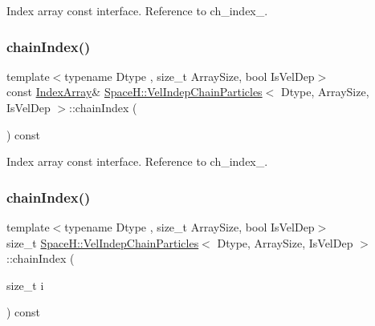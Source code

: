 Index array const interface. Reference to ch\+\_\+index\+\_\+. 

\mbox{\label{class_space_h_1_1_vel_indep_chain_particles_a4136b399758a4547ce22024318d9b654}} 
\subsubsection{\texorpdfstring{chain\+Index()}{chainIndex()}\hspace{0.1cm}{\footnotesize\ttfamily [2/4]}}
{\footnotesize\ttfamily template$<$typename Dtype , size\+\_\+t Array\+Size, bool Is\+Vel\+Dep$>$ \\
const \mbox{\hyperlink{class_space_h_1_1_vel_indep_chain_particles_a48b9183f8d68fe8af42bf405125d450c}{Index\+Array}}\& \mbox{\hyperlink{class_space_h_1_1_vel_indep_chain_particles}{Space\+H\+::\+Vel\+Indep\+Chain\+Particles}}$<$ Dtype, Array\+Size, Is\+Vel\+Dep $>$\+::chain\+Index (\begin{DoxyParamCaption}{ }\end{DoxyParamCaption}) const\hspace{0.3cm}{\ttfamily [inline]}}



Index array const interface. Reference to ch\+\_\+index\+\_\+. 

\mbox{\label{class_space_h_1_1_vel_indep_chain_particles_ae66137f6ce2394142db438fd010ae17c}} 
\subsubsection{\texorpdfstring{chain\+Index()}{chainIndex()}\hspace{0.1cm}{\footnotesize\ttfamily [3/4]}}
{\footnotesize\ttfamily template$<$typename Dtype , size\+\_\+t Array\+Size, bool Is\+Vel\+Dep$>$ \\
size\+\_\+t \mbox{\hyperlink{class_space_h_1_1_vel_indep_chain_particles}{Space\+H\+::\+Vel\+Indep\+Chain\+Particles}}$<$ Dtype, Array\+Size, Is\+Vel\+Dep $>$\+::chain\+Index (\begin{DoxyParamCaption}\item[{size\+\_\+t}]{i }\end{DoxyParamCaption}) const\hspace{0.3cm}{\ttfamily [inline]}}



